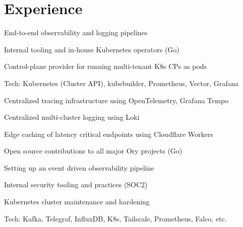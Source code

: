 \documentclass[]{config}
\begin{document}
\begin{minipage}[t]{0.66\textwidth} 


\section{Experience}

\vspace{\topsep} %
\vspace{\topsep} %
\begin{tightemize}
\item End-to-end observability and logging pipelines
\item Internal tooling and in-house Kubernetes operators (Go)
\item Control-plane provider for running multi-tenant K8s CPs as pods
\item Tech: Kubernetes (Cluster API), kubebuilder, Prometheus, Vector, Grafana
\end{tightemize}
\sectionsep


\vspace{\topsep} %
\begin{tightemize}
\item Centralized tracing infrastructure using OpenTelemetry, Grafana Tempo
\item Centralized multi-cluster logging using Loki
\item Edge caching of latency critical endpoints using Cloudflare Workers
\item Open source contributions to all major Ory projects (Go)
\end{tightemize}
\sectionsep


\vspace{\topsep} %
\begin{tightemize}
\item Setting up an event driven observability pipeline
\item Internal security tooling and practices (SOC2)
\item Kubernetes cluster maintenance and hardening
\item Tech: Kafka, Telegraf, InfluxDB, K8s, Tailscale, Prometheus, Falco, etc.
\end{tightemize}
\sectionsep



\end{minipage}
\end{document}
